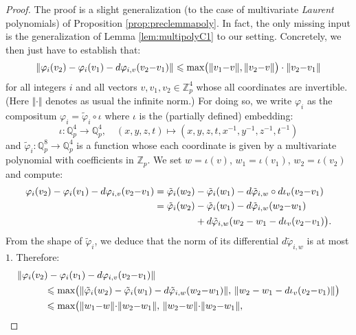 \documentclass[11pt]{article}
\numberwithin{equation}{section}
\numberwithin{figure}{section}
\renewcommand{\leq}{\leqslant}
\theoremstyle{definition}
\newcommand{\Z}{\mathbb Z}
\newcommand{\Zp}{\Z_p}
\newcommand{\Q}{\mathbb Q}
\newcommand{\Qp}{\Q_p}
\renewcommand{\max}{\text{\rm max}}
\begin{document}
\begin{proof}
The proof is a slight generalization (to the case of multivariate 
\emph{Laurent} polynomials) of Proposition \ref{prop:preclemmapoly}. 
In fact, the only missing input is the generalization of Lemma 
\ref{lem:multipolyC1} to our setting. Concretely, we then just have 
to establish that: 
\begin{equation}
\label{eq:multilaurentC1}
\Vert \varphi_i(v_2) - \varphi_i(v_1) - d\varphi_{i,v}(v_2{-}v_1) \Vert 
  \leq \max
  \big(\Vert v_1{-}v \Vert, \Vert v_2{-}v \Vert \big) \cdot \Vert v_2{-}v_1 \Vert
\end{equation}
for all integers $i$ and
all vectors $v, v_1, v_2 \in \Zp^4$ whose all coordinates are
invertible. (Here $\Vert \cdot \Vert$ denotes as usual the infinite
norm.) For doing so, we write $\varphi_i$ as the compositum
$\varphi_i = \tilde \varphi_i \circ \iota$ where $\iota$ is the
(partially defined) embedding:
$$\iota : \Qp^4 \to \Qp^4, \quad (x,y,z,t) \mapsto (x,y,z,t, x^{-1},
y^{-1}, z^{-1}, t^{-1})$$
and $\tilde \varphi_i : \Qp^8 \to \Qp^4$ is a function whose each
coordinate is given by a multivariate polynomial with coefficients 
in $\Zp$. We set $w = \iota(v)$, $w_1 = \iota(v_1)$, $w_2 = \iota
(v_2)$ and compute:
\begin{align*}
\varphi_i(v_2) - \varphi_i(v_1) - d\varphi_{i,v}(v_2{-}v_1)
  & = \tilde \varphi_i(w_2) - \tilde \varphi_i(w_1) - d\tilde \varphi_{i,w}
\circ d \iota_v (v_2{-}v_1) \\
  & = \tilde \varphi_i(w_2) - \tilde \varphi_i(w_1) - d\tilde \varphi_{i,w} (w_2{-}w_1) \\
  & \hspace{1.5cm} {}+ d\tilde \varphi_{i,w}( w_2 - w_1 - d \iota_v (v_2{-}v_1)\big).
\end{align*}
From the shape of $\tilde \varphi_i$, we deduce that the norm of its
differential $d\tilde \varphi_{i,w}$ is at most $1$. Therefore:
\begin{align}
&\Vert \varphi_i(v_2) - \varphi_i(v_1) - d\varphi_{i,v}(v_2{-}v_1) \Vert \smallskip \nonumber \\
&\hspace{1cm} \leq \max\big(
  \Vert \tilde \varphi_i(w_2) - \tilde \varphi_i(w_1) - d\tilde \varphi_{i,w} (w_2{-}w_1) \Vert, \,
  \Vert w_2 - w_1 - d \iota_v (v_2{-}v_1) \Vert\big) \smallskip \nonumber \\
&\hspace{1cm} \leq \max\big(
  \Vert w_1{-}w \Vert {\cdot} \Vert w_2{-}w_1 \Vert,\,
  \Vert w_2{-}w \Vert {\cdot} \Vert w_2{-}w_1 \Vert,\,

\end{align}
\end{proof}
\end{document}
